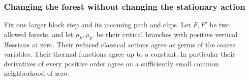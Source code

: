 \subsubsection{Changing the forest without changing the stationary action}
\label{subsec:path-forest-independence}

\begin{lemma}
\label{lem:path-forest-independence}
Fix one larger block step and its incoming path and clips. Let $F,F'$ be
two allowed forests, and let $\rho_F,\rho_{F'}$ be their critical branches
with positive vertical Hessians at zero. Their reduced classical actions
agree as germs of the coarse variables. Their thermal functions agree up
to a constant. In particular their derivatives of every positive order
agree on a sufficiently small common neighborhood of zero.
\end{lemma}
